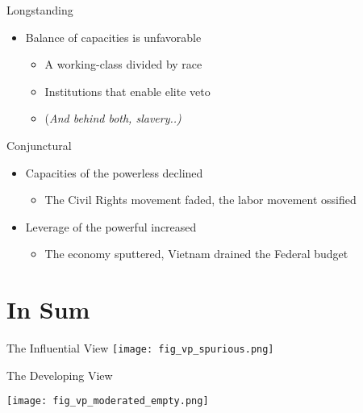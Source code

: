 \documentclass{beamer}
\begin{document}
\begin{frame}{Longstanding}
\begin{itemize}[<+->]
    \item[] \alert{Balance of capacities is unfavorable}
        \begin{itemize}
            \item A working-class divided by race
            \item Institutions that enable elite veto
            \item[] (\textit{And behind both, slavery..)}
        \end{itemize}
\end{itemize}
\end{frame}

\begin{frame}{Conjunctural}
\begin{itemize}[<+->]
    \item[] \alert{Capacities of the powerless declined}
    \begin{itemize}
        \item[] The Civil Rights movement faded, the labor movement ossified
    \end{itemize}
    \item[] \alert{Leverage of the powerful increased}
    \begin{itemize}
        \item[] The economy sputtered, Vietnam drained the Federal budget
    \end{itemize}
\end{itemize}
\end{frame}


\section{In Sum}

\begin{frame}{The Influential View}
\texttt{[image: fig\_vp\_spurious.png]}
\end{frame}

\begin{frame}{The Developing View}
\begin{center}
        \texttt{[image: fig\_vp\_moderated\_empty.png]}
\end{center}
\end{frame}
\end{document}
